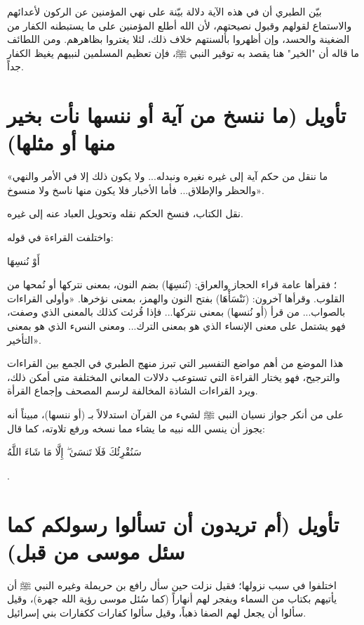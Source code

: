 \begin{fawaid}
بيّن الطبري أن في هذه الآية دلالة بيّنة على نهي المؤمنين عن الركون لأعدائهم والاستماع لقولهم وقبول نصيحتهم، لأن الله أطلع المؤمنين على ما يستبطنه الكفار من الضغينة والحسد، وإن أظهروا بألسنتهم خلاف ذلك، لئلا يغتروا بظاهرهم.
ومن اللطائف ما قاله  أن "الخير" هنا يقصد به توقير النبي ﷺ، فإن تعظيم المسلمين لنبيهم يغيظ الكفار جداً.
\end{fawaid}

\separator

\section{تأويل (ما ننسخ من آية أو ننسها نأت بخير منها أو مثلها)}
 «ما ننقل من حكم آية إلى غيره نغيره ونبدله... ولا يكون ذلك إلا في الأمر والنهي والحظر والإطلاق... فأما الأخبار فلا يكون منها ناسخ ولا منسوخ».

 نقل الكتاب، فنسخ الحكم نقله وتحويل العباد عنه إلى غيره.

واختلفت القراءة في قوله: \begin{ayah}أَوْ نُنسِهَا\end{ayah}؛ فقرأها عامة قراء الحجاز والعراق: (نُنسِهَا) بضم النون، بمعنى نتركها أو نُمحها من القلوب. وقرأها آخرون: (نَنْسَأْهَا) بفتح النون والهمز، بمعنى نؤخرها.
 «وأولى القراءات بالصواب... من قرأ (أو نُنسها) بمعنى نتركها... فإذا قُرئت كذلك بالمعنى الذي وصفت، فهو يشتمل على معنى الإنساء الذي هو بمعنى الترك... ومعنى النسء الذي هو بمعنى التأخير».

\begin{fawaid}
هذا الموضع من أهم مواضع التفسير التي تبرز منهج الطبري في الجمع بين القراءات والترجيح، فهو يختار القراءة التي تستوعب دلالات المعاني المختلفة متى أمكن ذلك، ويرد القراءات الشاذة المخالفة لرسم المصحف وإجماع القرأة.
\end{fawaid}

 على من أنكر جواز نسيان النبي ﷺ لشيء من القرآن استدلالاً بـ (أو ننسها)، مبيناً أنه يجوز أن ينسي الله نبيه ما يشاء مما نسخه ورفع تلاوته، كما قال: \begin{ayah}سَنُقْرِئُكَ فَلَا تَنسَىٰ ۖ إِلَّا مَا شَاءَ اللَّهُ\end{ayah}.

\separator

\section{تأويل (أم تريدون أن تسألوا رسولكم كما سئل موسى من قبل)}
اختلفوا في سبب نزولها؛ فقيل نزلت حين سأل رافع بن حريملة وغيره النبي ﷺ أن يأتيهم بكتاب من السماء ويفجر لهم أنهاراً (كما سُئل موسى رؤية الله جهرة)، وقيل سألوا أن يجعل لهم الصفا ذهباً، وقيل سألوا كفارات ككفارات بني إسرائيل.

